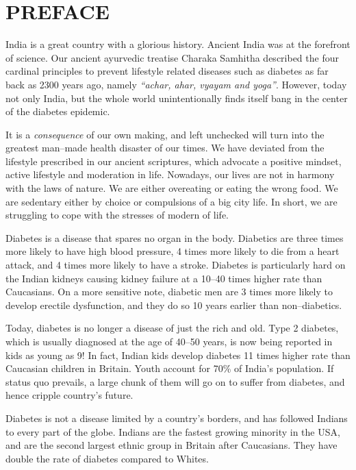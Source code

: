 
\chapter*{PREFACE}

India is a great country with a glorious history. Ancient India was at the forefront of science. Our ancient ayurvedic treatise Charaka Samhitha described the four cardinal principles to prevent lifestyle related diseases such as diabetes as far back as 2300 years ago, namely \textit{“achar, ahar, vyayam and yoga”}. However, today not only India, but the whole world unintentionally finds itself bang in the center of the diabetes epidemic.

It is a \textit{consequence} of our own making, and left unchecked will turn into the greatest man–made health disaster of our times. We have deviated from the lifestyle prescribed in our ancient scriptures, which advocate a positive mindset, active lifestyle and moderation in life. Nowadays, our lives are not in harmony with the laws of nature. We are either overeating or eating the wrong food. We are sedentary either by choice or compulsions of a big city life. In short, we are struggling to cope with the stresses of modern of life.

Diabetes is a disease that spares no organ in the body. Diabetics are three times more likely to have high blood pressure, 4 times more likely to die from a heart attack, and 4 times more likely to have a stroke. Diabetes is particularly hard on the Indian kidneys causing kidney failure at a 10–40 times higher rate than Caucasians. On a more sensitive note, diabetic men are 3 times more likely to develop erectile dysfunction, and they do so 10 years earlier than non–diabetics.

Today, diabetes is no longer a disease of just the rich and old. Type 2 diabetes, which is usually diagnosed at the age of 40–50 years, is now being reported in kids as young as 9! In fact, Indian kids develop diabetes 11 times higher rate than Caucasian children in Britain. Youth account for 70\% of India’s population. If status quo prevails, a large chunk of them will go on to suffer from diabetes, and hence cripple country’s future.

Diabetes is not a disease limited by a country’s borders, and has followed Indians to every part of the globe. Indians are the fastest growing minority in the USA, and are the second largest ethnic group in Britain after Caucasians. They have double the rate of diabetes compared to Whites.

